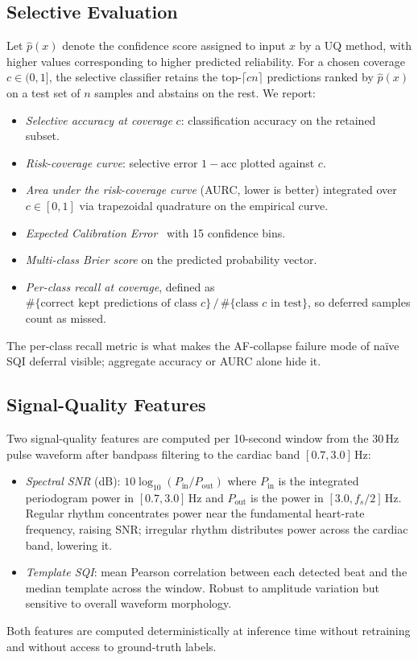\documentclass[journal]{IEEEtran}
\begin{document}
\subsection{Selective Evaluation}
Let $\hat{p}(x)$ denote the confidence score assigned to input $x$ by a UQ method, with higher values corresponding to higher predicted reliability. For a chosen coverage $c \in (0, 1]$, the selective classifier retains the top-$\lceil cn \rceil$ predictions ranked by $\hat{p}(x)$ on a test set of $n$ samples and abstains on the rest. We report:
\begin{itemize}
\item \emph{Selective accuracy at coverage} $c$: classification accuracy on the retained subset.
\item \emph{Risk-coverage curve}: selective error $1 - \text{acc}$ plotted against $c$.
\item \emph{Area under the risk-coverage curve} (AURC, lower is better) integrated over $c \in [0, 1]$ via trapezoidal quadrature on the empirical curve.
\item \emph{Expected Calibration Error}~\cite{naeini2015ece} with 15 confidence bins.
\item \emph{Multi-class Brier score} on the predicted probability vector.
\item \emph{Per-class recall at coverage}, defined as $\#\{\text{correct kept predictions of class } c\}\,/\,\#\{\text{class } c \text{ in test}\}$, so deferred samples count as missed.
\end{itemize}
The per-class recall metric is what makes the AF-collapse failure mode of na\"{i}ve SQI deferral visible; aggregate accuracy or AURC alone hide it.

\subsection{Signal-Quality Features}
Two signal-quality features are computed per 10-second window from the 30\,Hz pulse waveform after bandpass filtering to the cardiac band $[0.7, 3.0]$\,Hz:
\begin{itemize}
\item \emph{Spectral SNR} (dB): $10 \log_{10} (P_{\text{in}} / P_{\text{out}})$ where $P_{\text{in}}$ is the integrated periodogram power in $[0.7, 3.0]$\,Hz and $P_{\text{out}}$ is the power in $[3.0, f_s/2]$\,Hz. Regular rhythm concentrates power near the fundamental heart-rate frequency, raising SNR; irregular rhythm distributes power across the cardiac band, lowering it.
\item \emph{Template SQI}: mean Pearson correlation between each detected beat and the median template across the window. Robust to amplitude variation but sensitive to overall waveform morphology.
\end{itemize}
Both features are computed deterministically at inference time without retraining and without access to ground-truth labels.
\end{document}
